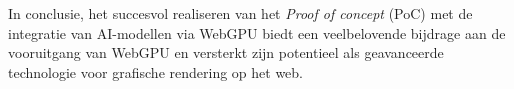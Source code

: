 \bigbreak{}
In conclusie, het succesvol realiseren van het \textit{Proof of concept} (PoC) met de integratie van AI-modellen via WebGPU biedt een veelbelovende bijdrage aan de vooruitgang van WebGPU en versterkt zijn potentieel als geavanceerde technologie voor grafische rendering op het web.

\pagebreak

